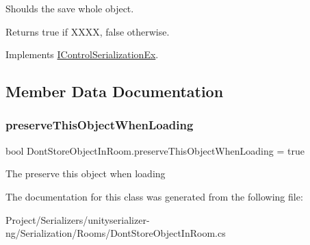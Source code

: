 Shoulds the save whole object. 

\begin{DoxyReturn}{Returns}
{\ttfamily true} if X\+X\+XX, {\ttfamily false} otherwise.
\end{DoxyReturn}


Implements \hyperlink{interface_i_control_serialization_ex_a7632c9b446f991de87cfd0f4a69bfeb7}{I\+Control\+Serialization\+Ex}.



\subsection{Member Data Documentation}
\mbox{\label{class_dont_store_object_in_room_a64b5902d6e6b768a25925edc74c4782d}} 
\subsubsection{\texorpdfstring{preserve\+This\+Object\+When\+Loading}{preserveThisObjectWhenLoading}}
{\footnotesize\ttfamily bool Dont\+Store\+Object\+In\+Room.\+preserve\+This\+Object\+When\+Loading = true}



The preserve this object when loading 



The documentation for this class was generated from the following file\+:\begin{DoxyCompactItemize}
\item 
Project/\+Serializers/unityserializer-\/ng/\+Serialization/\+Rooms/Dont\+Store\+Object\+In\+Room.\+cs\end{DoxyCompactItemize}
